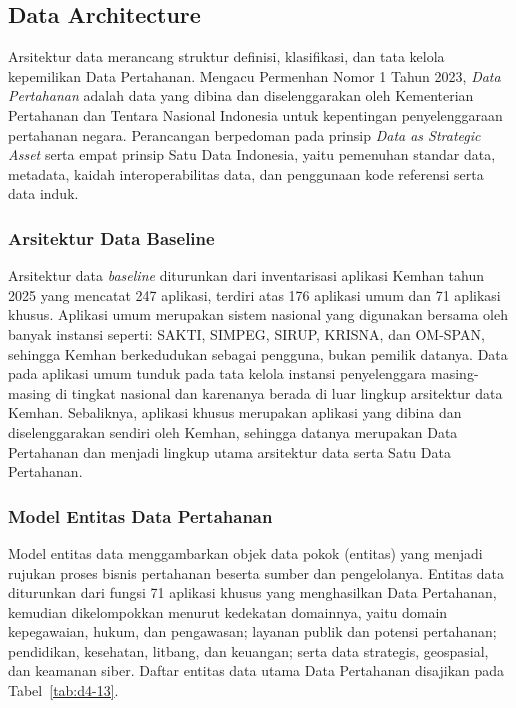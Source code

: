 \subsection{Data Architecture}

Arsitektur data merancang struktur definisi, klasifikasi, dan tata kelola kepemilikan Data Pertahanan. Mengacu Permenhan Nomor 1 Tahun 2023, \textit{Data Pertahanan} adalah data yang dibina dan diselenggarakan oleh Kementerian Pertahanan dan Tentara Nasional Indonesia untuk kepentingan penyelenggaraan pertahanan negara. Perancangan berpedoman pada prinsip \textit{Data as Strategic Asset} serta empat prinsip Satu Data Indonesia, yaitu pemenuhan standar data, metadata, kaidah interoperabilitas data, dan penggunaan kode referensi serta data induk.

\subsubsection{Arsitektur Data Baseline}

Arsitektur data \textit{baseline} diturunkan dari inventarisasi aplikasi Kemhan tahun 2025 yang mencatat 247 aplikasi, terdiri atas 176 aplikasi umum dan 71 aplikasi khusus. Aplikasi umum merupakan sistem nasional yang digunakan bersama oleh banyak instansi seperti: SAKTI, SIMPEG, SIRUP, KRISNA, dan OM-SPAN, sehingga Kemhan berkedudukan sebagai pengguna, bukan pemilik datanya. Data pada aplikasi umum tunduk pada tata kelola instansi penyelenggara masing-masing di tingkat nasional dan karenanya berada di luar lingkup arsitektur data Kemhan. Sebaliknya, aplikasi khusus merupakan aplikasi yang dibina dan diselenggarakan sendiri oleh Kemhan, sehingga datanya merupakan Data Pertahanan dan menjadi lingkup utama arsitektur data serta Satu Data Pertahanan.

\subsubsection{Model Entitas Data Pertahanan}

Model entitas data menggambarkan objek data pokok (entitas) yang menjadi rujukan proses bisnis pertahanan beserta sumber dan pengelolanya. Entitas data diturunkan dari fungsi 71 aplikasi khusus yang menghasilkan Data Pertahanan, kemudian dikelompokkan menurut kedekatan domainnya, yaitu domain kepegawaian, hukum, dan pengawasan; layanan publik dan potensi pertahanan; pendidikan, kesehatan, litbang, dan keuangan; serta data strategis, geospasial, dan keamanan siber. Daftar entitas data utama Data Pertahanan disajikan pada Tabel~\ref{tab:d4-13}.

